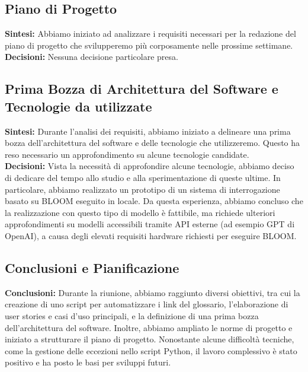 \documentclass{article}
\begin{document}
    \subsection{Piano di Progetto}
    \textbf{Sintesi:} Abbiamo iniziato ad analizzare i requisiti necessari per la redazione del piano di progetto che svilupperemo più corposamente nelle prossime settimane. \\
    \textbf{Decisioni:} Nessuna decisione particolare presa.

    \subsection{Prima Bozza di Architettura del Software e Tecnologie da utilizzate}
    \textbf{Sintesi:} Durante l'analisi dei requisiti, abbiamo iniziato a delineare una prima bozza dell'architettura del software e delle tecnologie che utilizzeremo. Questo ha reso necessario un approfondimento su alcune tecnologie candidate. \\
    \textbf{Decisioni:} Vista la necessità di approfondire alcune tecnologie, abbiamo deciso di dedicare del tempo allo studio e alla sperimentazione di queste ultime. In particolare, abbiamo realizzato un prototipo di un sistema di interrogazione basato su BLOOM eseguito in locale. Da questa esperienza, abbiamo concluso che la realizzazione con questo tipo di modello è fattibile, ma richiede ulteriori approfondimenti su modelli accessibili tramite API esterne (ad esempio GPT di OpenAI), a causa degli elevati requisiti hardware richiesti per eseguire BLOOM.
    

    \subsection*{Conclusioni e Pianificazione} 
    \textbf{Conclusioni:} Durante la riunione, abbiamo raggiunto diversi obiettivi, tra cui la creazione di uno script per automatizzare i link del glossario, l'elaborazione di user stories e casi d'uso principali, e la definizione di una prima bozza dell'architettura del software. Inoltre, abbiamo ampliato le norme di progetto e iniziato a strutturare il piano di progetto. Nonostante alcune difficoltà tecniche, come la gestione delle eccezioni nello script Python, il lavoro complessivo è stato positivo e ha posto le basi per sviluppi futuri.
\end{document}
